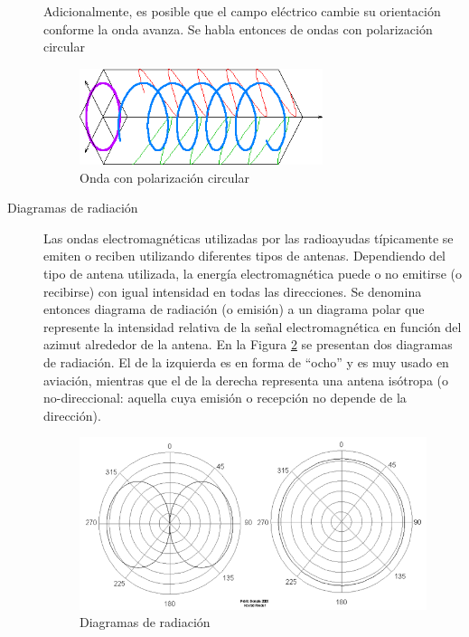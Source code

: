 \begin{description}
Adicionalmente, es posible que el campo el\'ectrico cambie su orientaci\'on conforme la onda avanza. Se habla entonces de ondas con polarizaci\'on circular 

\begin{figure}[!h]
  \centering
  \includegraphics[width=0.7\textwidth]{./Imagenes/06.01.adf/polarizacion-circular.png}  
  \caption{Onda con polarizaci\'on circular \cite{wikipedia_esp}}
  \label{fig:polarizacion-circular}
\end{figure}


\item [Diagramas de radiaci\'on] Las ondas electromagn\'eticas utilizadas por las radioayudas t\'ipicamente se emiten o reciben utilizando diferentes tipos de antenas. Dependiendo del tipo de antena utilizada, la energ\'ia electromagn\'etica puede o no emitirse (o recibirse) con igual intensidad en todas las direcciones.
Se denomina entonces diagrama de radiaci\'on (o emisi\'on) a un diagrama polar que represente la intensidad relativa de la se\~nal electromagn\'etica en funci\'on del azimut alrededor de la antena.
En la Figura \ref{fig:diagramas-radiacion} se presentan dos diagramas de radiaci\'on. El de la izquierda es en forma de ``ocho'' y es muy usado en aviaci\'on, mientras que el de la derecha representa una antena is\'otropa (o no-direccional: aquella cuya emisi\'on o recepci\'on no depende de la direcci\'on). 


\begin{figure}[!h]
  \centering
 \includegraphics[width=\textwidth]{./Imagenes/06.01.adf/diagramas-radiacion.png}  
  \caption{Diagramas de radiaci\'on \cite{wikipedia_esp}}
  \label{fig:diagramas-radiacion}
\end{figure}

\end{description}


